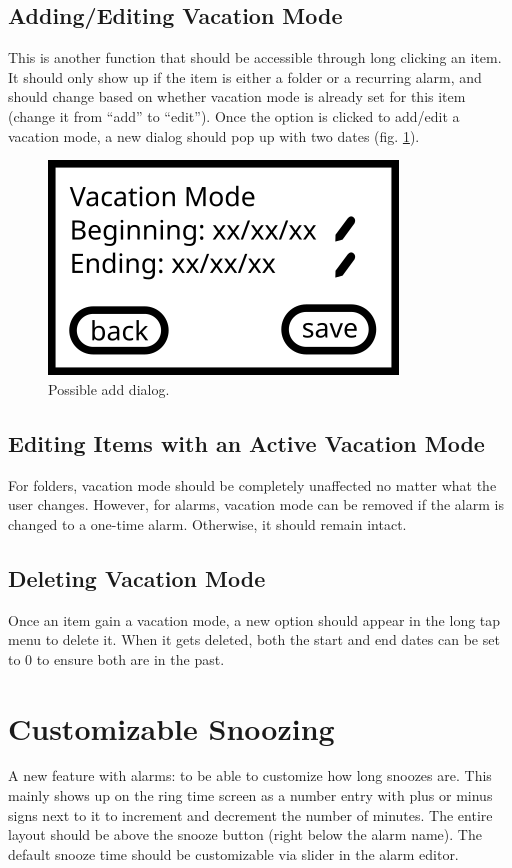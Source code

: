 \documentclass[11pt]{article} %
\begin{document}
\subsection{Adding/Editing Vacation Mode}
This is another function that should be accessible through long clicking an item. It should only show up if the item is either a folder or a recurring alarm, and should change based on whether vacation mode is already set for this item (change it from ``add'' to ``edit''). Once the option is clicked to add/edit a vacation mode, a new dialog should pop up with two dates (fig. \ref{fig:vacationAdd}).

\begin{figure}[h]
	\centering
	\includegraphics[scale=0.5]{vacation mode add dialog.png}
	\caption{Possible add dialog.}
	\label{fig:vacationAdd}
\end{figure}

\subsection{Editing Items with an Active Vacation Mode}
For folders, vacation mode should be completely unaffected no matter what the user changes. However, for alarms, vacation mode can be removed if the alarm is changed to a one-time alarm. Otherwise, it should remain intact. 

\subsection{Deleting Vacation Mode}
Once an item gain a vacation mode, a new option should appear in the long tap menu to delete it. When it gets deleted, both the start and end dates can be set to 0 to ensure both are in the past.

\section{Customizable Snoozing}
\label{sec:customSnoozing}
A new feature with alarms: to be able to customize how long snoozes are. This mainly shows up on the ring time screen as a number entry with plus or minus signs next to it to increment and decrement the number of minutes. The entire layout should be above the snooze button (right below the alarm name). The default snooze time should be customizable via slider in the alarm editor. 
\end{document}
